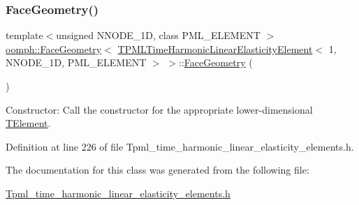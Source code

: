 \subsubsection{\texorpdfstring{Face\+Geometry()}{FaceGeometry()}}
{\footnotesize\ttfamily template$<$unsigned N\+N\+O\+D\+E\+\_\+1D, class P\+M\+L\+\_\+\+E\+L\+E\+M\+E\+NT $>$ \\
\hyperlink{classoomph_1_1FaceGeometry}{oomph\+::\+Face\+Geometry}$<$ \hyperlink{classoomph_1_1TPMLTimeHarmonicLinearElasticityElement}{T\+P\+M\+L\+Time\+Harmonic\+Linear\+Elasticity\+Element}$<$ 1, N\+N\+O\+D\+E\+\_\+1D, P\+M\+L\+\_\+\+E\+L\+E\+M\+E\+NT $>$ $>$\+::\hyperlink{classoomph_1_1FaceGeometry}{Face\+Geometry} (\begin{DoxyParamCaption}{ }\end{DoxyParamCaption})\hspace{0.3cm}{\ttfamily [inline]}}



Constructor\+: Call the constructor for the appropriate lower-\/dimensional \hyperlink{classoomph_1_1TElement}{T\+Element}. 



Definition at line 226 of file Tpml\+\_\+time\+\_\+harmonic\+\_\+linear\+\_\+elasticity\+\_\+elements.\+h.



The documentation for this class was generated from the following file\+:\begin{DoxyCompactItemize}
\item 
\hyperlink{Tpml__time__harmonic__linear__elasticity__elements_8h}{Tpml\+\_\+time\+\_\+harmonic\+\_\+linear\+\_\+elasticity\+\_\+elements.\+h}\end{DoxyCompactItemize}
